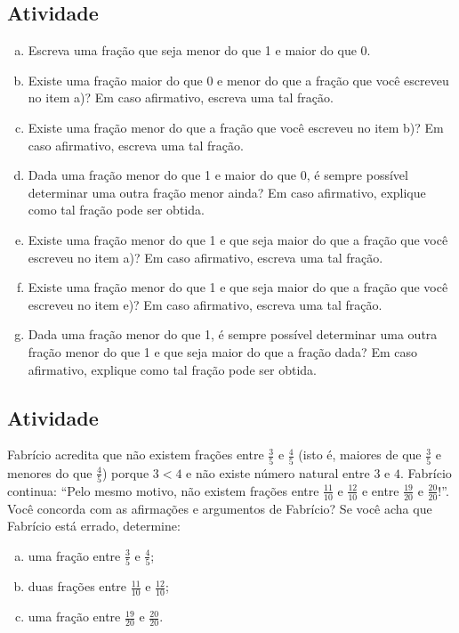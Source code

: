 \subsection{Atividade}
\begin{enumerate}[a)]
 \item Escreva uma fração que seja menor do que 1 e maior do que 0.
 \item Existe uma fração maior do que 0 e menor do que a fração que você escreveu no item a)? Em caso afirmativo, escreva uma tal fração.
 \item Existe uma fração menor do que a fração que você escreveu no item b)? Em caso afirmativo, escreva uma tal fração.
 \item Dada uma fração menor do que 1 e maior do que 0, é sempre possível determinar uma outra fração menor ainda? Em caso afirmativo, explique como tal fração pode ser obtida.
 \item Existe uma fração menor do que 1 e que seja maior do que a fração que você escreveu no item a)? Em caso afirmativo, escreva uma tal fração.
 \item Existe uma fração menor do que 1 e que seja maior do que a fração que você escreveu no item e)? Em caso afirmativo, escreva uma tal fração.
 \item Dada uma fração menor do que 1, é sempre possível determinar uma outra fração menor do que 1 e que seja maior do que a fração dada? Em caso afirmativo, explique como tal fração pode ser obtida.
\end{enumerate}

\subsection{Atividade}

Fabrício acredita que não existem frações entre $\frac{3}{5}$ e $\frac{4}{5}$ (isto é, maiores de que $\frac{3}{5}$ e menores do que $\frac{4}{5}$) porque $3 < 4$ e não existe número natural entre $3$ e $4$. Fabrício continua: ``Pelo mesmo motivo, não existem frações entre $\frac{11}{10}$ e $\frac{12}{10}$ e entre $\frac{19}{20}$ e $\frac{20}{20}$!''. Você concorda com as afirmações e argumentos de Fabrício? Se você acha que Fabrício está errado, determine:

\begin{enumerate}[a)]
\item  uma fração entre $\frac{3}{5}$ e $\frac{4}{5}$;

\item  duas frações entre $\frac{11}{10}$ e $\frac{12}{10}$;

\item  uma fração entre $\frac{19}{20}$ e $\frac{20}{20}$.
\end{enumerate}


